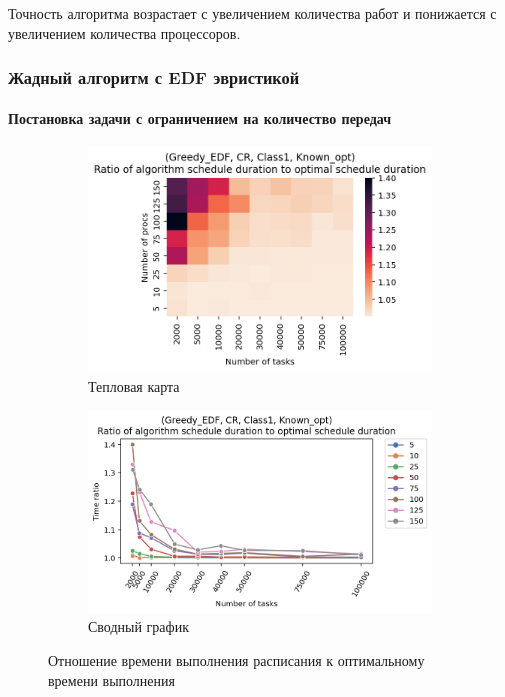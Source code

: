 Точность алгоритма возрастает с увеличением количества работ и понижается с увеличением количества процессоров.

\subsubsection{Жадный алгоритм с EDF эвристикой}

\paragraph{Постановка задачи с ограничением на количество передач}

\begin{figure}[!htbp]
    \centering
    \begin{subfigure}{0.49\textwidth}
        \includegraphics[width=\textwidth]{imgs/ideal_1/CR_EDF/th.png}
        \caption{Тепловая карта}
        \label{fig:CR-EDF-times-heatmap}
    \end{subfigure}
    \hfill
    \begin{subfigure}{0.49\textwidth}
        \includegraphics[width=\textwidth]{imgs/ideal_1/CR_EDF/gr_amalgamated.png}
        \caption{Сводный график} 
        \label{fig:CR-EDF-times-compiled} 
    \end{subfigure}
    \caption{Отношение времени выполнения расписания к оптимальному времени выполнения}
\end{figure}


